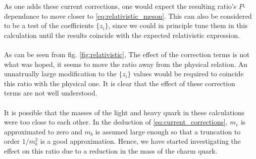 As one adds these current corrections, one would expect the resulting ratio's $\underline{P}$-dependance to move closer to \eqref{eq:relativistic_meson}. This can also be considered to be a 
test of the coefficients $\{ z_i \}$, since we could in principle tune them in this calculation until the results coincide with the expected relativistic expression.
\\ \\
As can be seen from fig. \ref{fig:relativistic}, The effect of the correction terms is not what was hoped, it seems to move the ratio away from the physical relation. 
An unnatrually large modification to the $\{z_i\}$ values would be required to coincide this ratio with the physical one. It is clear that the effect of these correction terms are not well understood.
\\ \\
It is possible that the masses of the light and heavy quark in these calculations were too close to each other. In the deduction of \eqref{eq:current_corrections}, $m_c$ is 
approximated to zero and $m_b$ is assumed large enough so that a truncation to order $1/m_b^2$ is a good approximation. Hence, we have started investigating the effect on this 
ratio due to a reduction in the mass of the charm quark.

